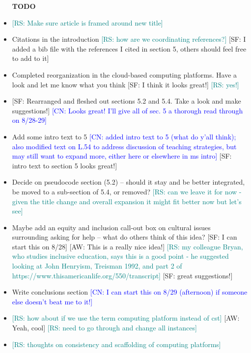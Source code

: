 \newcommand{\aw}[1]{{\textcolor{armygreen}{[AW: #1]}}} %
\newcommand{\sarah}[1]{{\textcolor{amethyst}{[SF: #1]}}} %
\newcommand{\rs}[1]{{\textcolor{teal}{[RS: #1]}}} %
\newcommand{\jo}[1]{{\textcolor{pauburn}{[JO: #1]}}} %
\newcommand{\cn}[1]{{\textcolor{blue}{[CN: #1]}}} %

\begin{itemize}
\item [\textbf{TODO}]
    \item \rs{Make sure article is framed around new title}
    \item Citations in the introduction \rs{how are we coordinating references?} \sarah{I added a bib file with the references I cited in section 5, others should feel free to add to it}
    \item Completed reorganization in the cloud-based computing platforms. Have a look and let me know what you think \sarah{I think it looks great!} \rs{yes!}
    \item \sarah{Rearranged and fleshed out sections 5.2 and 5.4. Take a look and make suggestions!} \cn{Looks great! I'll give all of sec. 5 a thorough read through on 8/28-29}
    \item Add some intro text to 5 \cn{added intro text to 5 (what do y'all think); also modified text on L.54 to address discussion of teaching strategies, but may still want to expand more, either here or elsewhere in ms intro} \sarah{intro text to section 5 looks great!}
    \item Decide on pseudocode section (5.2) -- should it stay and be better integrated, be moved to a sub-section of 5.4, or removed? \rs{can we leave it for now - given the title change and overall expansion it might fit better now but let's see}
    \item Maybe add an equity and inclusion call-out box on cultural issues surrounding asking for help -- what do others think of this idea? \sarah{I can start this on 8/28} \aw{This is a really nice idea!} \rs{my colleague Bryan, who studies inclusive education, says this is a good point - he suggested looking at John Henryism, Treisman 1992, and part 2 of https://www.thisamericanlife.org/550/transcript} \sarah{great suggestions!}
    \item Write conclusions section \cn{I can start this on 8/29 (afternoon) if someone else doesn't beat me to it!}
    \item \rs{how about if we use the term computing platform instead of cst} \aw{Yeah, cool} \rs{need to go through and change all instances}
    \item \rs{thoughts on consistency and scaffolding of computing platforms}
\end{itemize}


